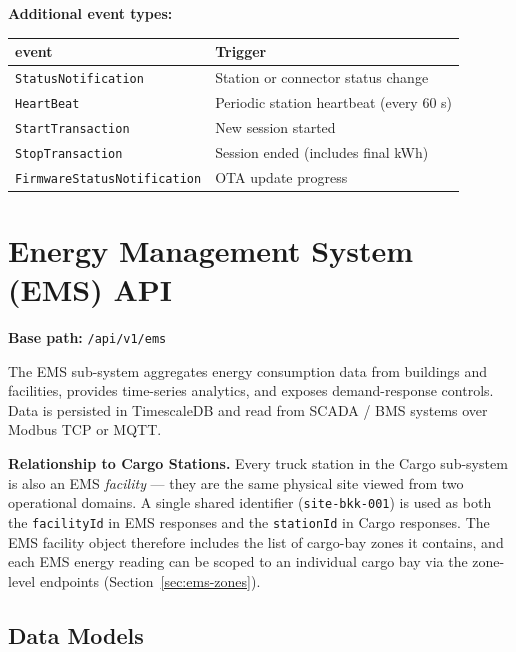 \documentclass{article}
\begin{document}
\textbf{Additional event types:}

\begin{center}
\begin{tabular}{ll}
\toprule
\textbf{event} & \textbf{Trigger}\\
\midrule
\texttt{StatusNotification}  & Station or connector status change\\
\texttt{HeartBeat}           & Periodic station heartbeat (every 60 s)\\
\texttt{StartTransaction}    & New session started\\
\texttt{StopTransaction}     & Session ended (includes final kWh)\\
\texttt{FirmwareStatusNotification} & OTA update progress\\
\bottomrule
\end{tabular}
\end{center}

\newpage

\section{Energy Management System (EMS) API}

\textbf{Base path:} \texttt{/api/v1/ems}

The EMS sub-system aggregates energy consumption data from buildings and facilities,
provides time-series analytics, and exposes demand-response controls. Data is
persisted in TimescaleDB and read from SCADA / BMS systems over Modbus TCP or MQTT.

\textbf{Relationship to Cargo Stations.}
Every truck station in the Cargo sub-system is also an EMS \emph{facility} --- they
are the same physical site viewed from two operational domains. A single shared
identifier (\texttt{site-bkk-001}) is used as both the \texttt{facilityId} in EMS
responses and the \texttt{stationId} in Cargo responses. The EMS facility object
therefore includes the list of cargo-bay zones it contains, and each EMS energy
reading can be scoped to an individual cargo bay via the zone-level endpoints
(Section~\ref{sec:ems-zones}).

\subsection{Data Models}
\end{document}
